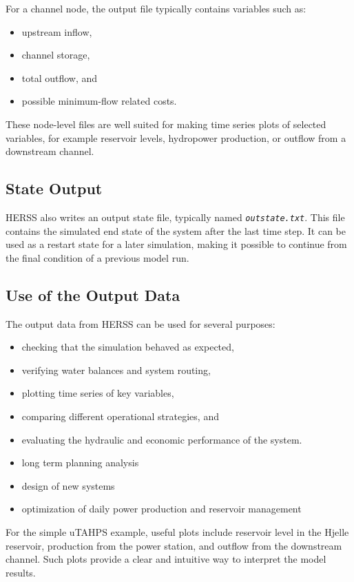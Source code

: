 \documentclass[a4paper, 12pt]{report}
\newcommand{\file}[1]{\textit{\texttt{#1}}}  %
\begin{document}
	For a channel node, the output file typically contains variables such as:

	\begin{itemize}
		\item upstream inflow,
		\item channel storage,
		\item total outflow, and
		\item possible minimum-flow related costs.
	\end{itemize}

	These node-level files are well suited for making time series plots of selected variables, for example reservoir levels, hydropower production, or outflow from a downstream channel.

	\subsection{State Output}

	HERSS also writes an output state file, typically named \file{outstate.txt}. This file contains the simulated end state of the system after the last time step. It can be used as a restart state for a later simulation, making it possible to continue from the final condition of a previous model run.


	\subsection{Use of the Output Data}
	The output data from HERSS can be used for several purposes:

	\begin{itemize}
		\item checking that the simulation behaved as expected,
		\item verifying water balances and system routing,
		\item plotting time series of key variables,
		\item comparing different operational strategies, and
		\item evaluating the hydraulic and economic performance of the system.
		\item long term planning analysis
		\item design of new systems
		\item optimization of daily power production and reservoir management
	\end{itemize}

	For the simple uTAHPS example, useful plots include reservoir level in the Hjelle reservoir, production from the power station, and outflow from the downstream channel. Such plots provide a clear and intuitive way to interpret the model results. \\
	
\end{document}
